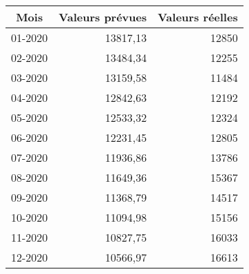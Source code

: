 \begin{tabular}{rrr}
\toprule
\multicolumn{1}{c}{Mois} & \multicolumn{1}{c}{Valeurs prévues} & \multicolumn{1}{c}{Valeurs réelles} \\
\midrule
01-2020 & 13817,13 & 12850 \\
02-2020 & 13484,34 & 12255 \\
03-2020 & 13159,58 & 11484 \\
04-2020 & 12842,63 & 12192 \\
05-2020 & 12533,32 & 12324 \\
06-2020 & 12231,45 & 12805 \\
07-2020 & 11936,86 & 13786 \\
08-2020 & 11649,36 & 15367 \\
09-2020 & 11368,79 & 14517 \\
10-2020 & 11094,98 & 15156 \\
11-2020 & 10827,75 & 16033 \\
12-2020 & 10566,97 & 16613 \\
\bottomrule
\end{tabular}
